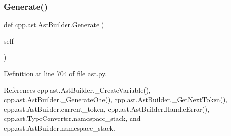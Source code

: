 \subsubsection{\texorpdfstring{Generate()}{Generate()}}
{\footnotesize\ttfamily def cpp.\+ast.\+Ast\+Builder.\+Generate (\begin{DoxyParamCaption}\item[{}]{self }\end{DoxyParamCaption})}



Definition at line 704 of file ast.\+py.



References cpp.\+ast.\+Ast\+Builder.\+\_\+\+Create\+Variable(), cpp.\+ast.\+Ast\+Builder.\+\_\+\+Generate\+One(), cpp.\+ast.\+Ast\+Builder.\+\_\+\+Get\+Next\+Token(), cpp.\+ast.\+Ast\+Builder.\+current\+\_\+token, cpp.\+ast.\+Ast\+Builder.\+Handle\+Error(), cpp.\+ast.\+Type\+Converter.\+namespace\+\_\+stack, and cpp.\+ast.\+Ast\+Builder.\+namespace\+\_\+stack.


